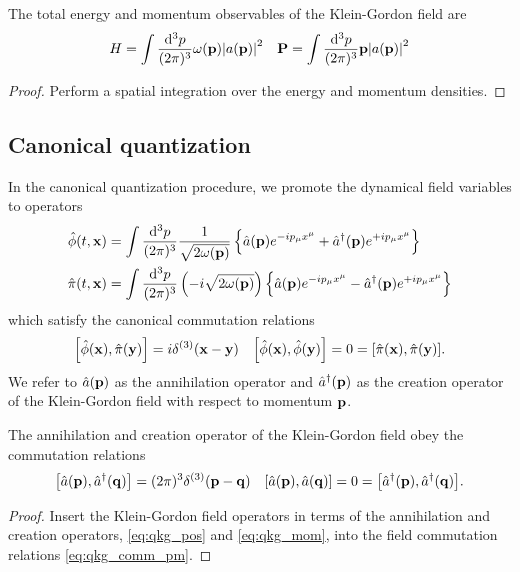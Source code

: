 \begin{lemma}
	The total energy and momentum observables of the Klein-Gordon field are
	\begin{align}
		H
		=
		\int\frac{\dd[3]{p}}{(2\pi)^3}
		\omega(\vb{p})\abs{a(\vb{p})}^2
		&&
		\vb{P}
		=
		\int\frac{\dd[3]{p}}{(2\pi)^3}
		\vb{p}\abs{a(\vb{p})}^2
		\label{eq:kg_energy_momentum}
	\end{align}
\end{lemma}
\begin{proof}
	Perform a spatial integration over the energy and momentum densities.
\end{proof}

\subsection{Canonical quantization}

\begin{definition}
	In the canonical quantization procedure, we promote the dynamical field variables to operators
	\begin{align}
		\hat\phi(t,\vb{x})
		&=
		\int\frac{\dd[3]{p}}{(2\pi)^3}
		\frac{1}{\sqrt{2\omega(\vb{p})}}
		\left\{
			\hat{a}(\vb{p})
			e^{-ip_\mu x^\mu}
			+
			\hat{a}^\dagger(\vb{p})
			e^{+ip_\mu x^\mu}
		\right\}
		\label{eq:qkg_pos}
		\\
		\hat\pi(t,\vb{x})
		&=
		\int\frac{\dd[3]{p}}{(2\pi)^3}
		\left(-i\sqrt{2\omega(\vb{p})}\right)
		\left\{
			\hat{a}(\vb{p})
			e^{-ip_\mu x^\mu}
			-
			\hat{a}^\dagger(\vb{p})
			e^{+ip_\mu x^\mu}
		\right\}
		\label{eq:qkg_mom}
	\end{align}
	which satisfy the canonical commutation relations
	\begin{align}
		\comm{\hat\phi(\vb{x})}{\hat\pi(\vb{y})}
		=
		i\delta^{(3)}(\vb{x}-\vb{y})
		&&
		\comm{\hat\phi(\vb{x})}{\hat\phi(\vb{y})}
		=
		0
		=
		\comm{\hat\pi(\vb{x})}{\hat\pi(\vb{y})}
		\label{eq:qkg_comm_pm}
		.
	\end{align}
	We refer to $\hat{a}(\vb{p})$ as the annihilation operator and $\hat{a}^\dagger(\vb{p})$ as the creation operator of the Klein-Gordon field with respect to momentum $\vb{p}$.
\end{definition}

\begin{theorem}
	The annihilation and creation operator of the Klein-Gordon field obey the commutation relations
	\begin{align}
		\comm{\hat{a}(\vb{p})}{\hat{a}^\dagger(\vb{q})}
		=
		(2\pi)^3\delta^{(3)}(\vb{p}-\vb{q})
		&&
		\comm{\hat{a}(\vb{p})}{\hat{a}(\vb{q})}
		=
		0
		=
		\comm{\hat{a}^\dagger(\vb{p})}{\hat{a}^\dagger(\vb{q})}
		\label{eq:kg_comm_ac}
		.
	\end{align}	
\end{theorem}
\begin{proof}
	Insert the Klein-Gordon field operators in terms of the annihilation and creation operators, \cref{eq:qkg_pos} and \cref{eq:qkg_mom}, into the field commutation relations \cref{eq:qkg_comm_pm}.
\end{proof}

